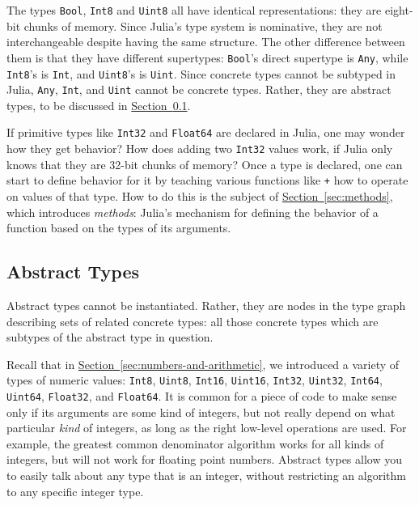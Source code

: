 \documentclass{article}
\renewcommand{\sec}[1]{\label{sec:#1}}
\newcommand{\Section}[1]{\hyperref[sec:#1]{Section~\ref*{sec:#1}}}
\begin{document}
The types \verb|Bool|, \verb|Int8| and \verb|Uint8| all have identical representations:
they are eight-bit chunks of memory.
Since Julia's type system is nominative, they are not interchangeable despite having the same structure.
The other difference between them is that they have different supertypes:
\verb|Bool|'s direct supertype is \verb|Any|, while \verb|Int8|'s is \verb|Int|, and \verb|Uint8|'s is \verb|Uint|.
Since concrete types cannot be subtyped in Julia, \verb|Any|, \verb|Int|, and \verb|Uint| cannot be concrete types.
Rather, they are abstract types, to be discussed in \Section{abstract-types}.

If primitive types like \verb|Int32| and \verb|Float64| are declared in Julia, one may wonder how they get behavior?
How does adding two \verb|Int32| values work, if Julia only knows that they are 32-bit chunks of memory?
Once a type is declared, one can start to define behavior for it by teaching various functions like \verb|+| how to operate on values of that type.
How to do this is the subject of \Section{methods}, which introduces \emph{methods}:
Julia's mechanism for defining the behavior of a function based on the types of its arguments.

\subsection{Abstract Types}\sec{abstract-types}

Abstract types cannot be instantiated.
Rather, they are nodes in the type graph describing sets of related concrete types:
all those concrete types which are subtypes of the abstract type in question.

Recall that in \Section{numbers-and-arithmetic}, we introduced a variety of types of numeric values:
\verb|Int8|, \verb|Uint8|, \verb|Int16|, \verb|Uint16|, \verb|Int32|, \verb|Uint32|, \verb|Int64|, \verb|Uint64|, \verb|Float32|, and \verb|Float64|.
It is common for a piece of code to make sense only if its arguments are some kind of integers, but not really depend on what particular \emph{kind} of integers, as long as the right low-level operations are used.
For example, the greatest common denominator algorithm works for all kinds of integers, but will not work for floating point numbers.
Abstract types allow you to easily talk about any type that is an integer, without restricting an algorithm to any specific integer type.
\end{document}
